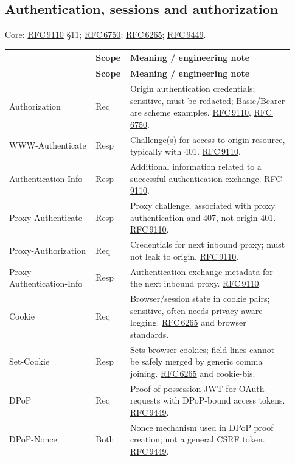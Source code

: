\documentclass[10pt,letterpaper,oneside]{article}
\newcommand{\rf}[1]{\href{https://www.rfc-editor.org/rfc/rfc#1.html}{RFC\,#1}}
\newcommand{\cataloghead}{\toprule\rowcolor{Navy}\multicolumn{1}{>{\columncolor{Navy}}p{0.291\linewidth}}{\color{white}\sffamily\bfseries Field} & \color{white}\sffamily\bfseries Scope & \color{white}\sffamily\bfseries Meaning / engineering note \\ \midrule}
\newcommand{\catalogstart}{\begingroup\footnotesize\setlength{\LTpre}{0.15em}\setlength{\LTpost}{0.6em}\begin{longtable}{>{\RaggedRight\arraybackslash}p{0.291\linewidth}>{\RaggedRight\arraybackslash}p{0.085\linewidth}>{\RaggedRight\arraybackslash}p{0.555\linewidth}}\cataloghead\endfirsthead\cataloghead\endhead}
\newcommand{\catalogend}{\bottomrule\end{longtable}\endgroup}
\begin{document}
\subsection{Authentication, sessions and authorization}
\begin{tipbox}\footnotesize Core: \rf{9110} §11; \rf{6750}; \rf{6265}; \rf{9449}.\end{tipbox}
\catalogstart
{\ttfamily\color{Deep}Authorization} & {\sffamily\scriptsize\color{Muted}Req} & Origin authentication credentials; sensitive, must be redacted; Basic/Bearer are scheme examples. \rf{9110}, \rf{6750}. \\ \midrule
{\ttfamily\color{Deep}WWW-\allowbreak{}Authenticate} & {\sffamily\scriptsize\color{Muted}Resp} & Challenge(s) for access to origin resource, typically with 401. \rf{9110}. \\ \midrule
{\ttfamily\color{Deep}Authentication-\allowbreak{}Info} & {\sffamily\scriptsize\color{Muted}Resp} & Additional information related to a successful authentication exchange. \rf{9110}. \\ \midrule
{\ttfamily\color{Deep}Proxy-\allowbreak{}Authenticate} & {\sffamily\scriptsize\color{Muted}Resp} & Proxy challenge, associated with proxy authentication and 407, not origin 401. \rf{9110}. \\ \midrule
{\ttfamily\color{Deep}Proxy-\allowbreak{}Authorization} & {\sffamily\scriptsize\color{Muted}Req} & Credentials for next inbound proxy; must not leak to origin. \rf{9110}. \\ \midrule
{\ttfamily\color{Deep}Proxy-\allowbreak{}Authentication-\allowbreak{}Info} & {\sffamily\scriptsize\color{Muted}Resp} & Authentication exchange metadata for the next inbound proxy. \rf{9110}. \\ \midrule
{\ttfamily\color{Deep}Cookie} & {\sffamily\scriptsize\color{Muted}Req} & Browser/session state in cookie pairs; sensitive, often needs privacy-aware logging. \rf{6265} and browser standards. \\ \midrule
{\ttfamily\color{Deep}Set-\allowbreak{}Cookie} & {\sffamily\scriptsize\color{Muted}Resp} & Sets browser cookies; field lines cannot be safely merged by generic comma joining. \rf{6265} and cookie-bis. \\ \midrule
{\ttfamily\color{Deep}DPoP} & {\sffamily\scriptsize\color{Muted}Req} & Proof-of-possession JWT for OAuth requests with DPoP-bound access tokens. \rf{9449}. \\ \midrule
{\ttfamily\color{Deep}DPoP-\allowbreak{}Nonce} & {\sffamily\scriptsize\color{Muted}Both} & Nonce mechanism used in DPoP proof creation; not a general CSRF token. \rf{9449}. \\ \midrule
\catalogend
\end{document}
